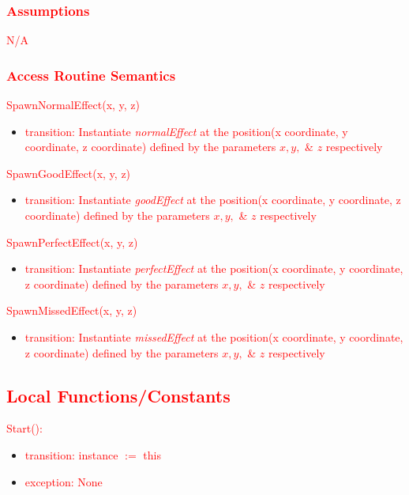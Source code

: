 \documentclass[12pt]{article}
\begin{document}
\subsubsection {\textcolor{red}{Assumptions}}
\textcolor{red}{N/A}

\subsubsection {\textcolor{red}{Access Routine Semantics}}
\noindent \textcolor{red}{SpawnNormalEffect(x, y, z)}
\begin{itemize}
    \item \textcolor{red}{transition: Instantiate \textit{normalEffect} at the position(x coordinate, y coordinate, z coordinate) defined by the parameters $x, y,$ \& $z$ respectively}
\end{itemize}
\noindent \textcolor{red}{SpawnGoodEffect(x, y, z)}
\begin{itemize}
    \item \textcolor{red}{transition: Instantiate \textit{goodEffect} at the position(x coordinate, y coordinate, z coordinate) defined by the parameters $x, y,$ \& $z$ respectively}
\end{itemize}
\noindent \textcolor{red}{SpawnPerfectEffect(x, y, z)}
\begin{itemize}
    \item \textcolor{red}{transition: Instantiate \textit{perfectEffect} at the position(x coordinate, y coordinate, z coordinate) defined by the parameters $x, y,$ \& $z$ respectively}
\end{itemize}
\noindent \textcolor{red}{SpawnMissedEffect(x, y, z)}
\begin{itemize}
    \item \textcolor{red}{transition: Instantiate \textit{missedEffect} at the position(x coordinate, y coordinate, z coordinate) defined by the parameters $x, y,$ \& $z$ respectively}
\end{itemize}
\subsection{\textcolor{red}{Local Functions/Constants}}
\noindent \textcolor{red}{Start():}
\begin{itemize}
	\item \textcolor{red}{transition: instance $:=$ this}
	\item \textcolor{red}{exception: None}
\end{itemize}
\end{document}
